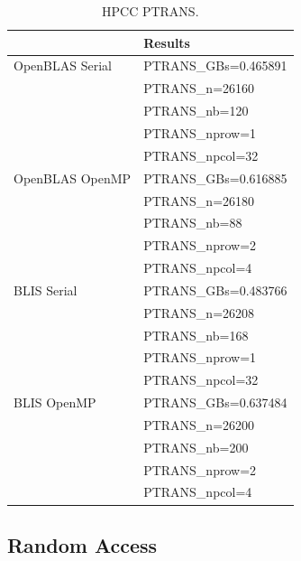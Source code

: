\documentclass{report}
\begin{document}
\begin{table}[H]
\begin{center}
\begin{tabular}{ |l|l| } 
\hline
                & Results \\
\hline
OpenBLAS Serial & PTRANS\_GBs=0.465891 \\
                & PTRANS\_n=26160 \\ 
                & PTRANS\_nb=120 \\
                & PTRANS\_nprow=1 \\
                & PTRANS\_npcol=32 \\
\hline
OpenBLAS OpenMP & PTRANS\_GBs=0.616885 \\
                & PTRANS\_n=26180 \\
                & PTRANS\_nb=88 \\
                & PTRANS\_nprow=2 \\
                & PTRANS\_npcol=4 \\
\hline
BLIS Serial     & PTRANS\_GBs=0.483766 \\
                & PTRANS\_n=26208 \\
                & PTRANS\_nb=168 \\
                & PTRANS\_nprow=1 \\
                & PTRANS\_npcol=32 \\
\hline
BLIS OpenMP     & PTRANS\_GBs=0.637484 \\
                & PTRANS\_n=26200 \\
                & PTRANS\_nb=200 \\
                & PTRANS\_nprow=2 \\
                & PTRANS\_npcol=4 \\
\hline
\end{tabular}
\end{center}
\caption{\label{tab:table-name}HPCC PTRANS.}
\end{table}


%
%
\subsection{Random Access}
\end{document}
